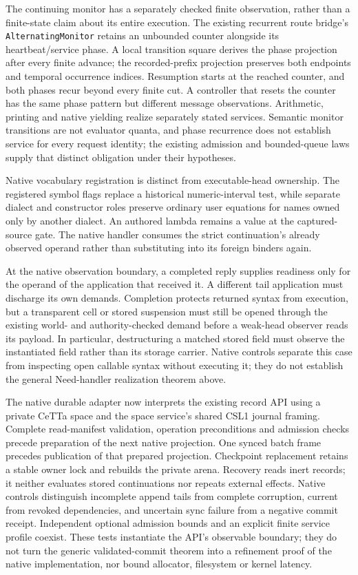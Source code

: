 \documentclass[11pt]{article}
\theoremstyle{definition}
\theoremstyle{remark}
\begin{document}
The continuing monitor has a separately checked finite observation, rather
than a finite-state claim about its entire execution. The existing recurrent
route bridge's \nolinkurl{AlternatingMonitor} retains an unbounded counter
alongside its heartbeat/service phase. A local transition square derives the
phase projection after every finite advance; the recorded-prefix projection
preserves both endpoints and temporal occurrence indices. Resumption starts
at the reached counter, and both phases recur beyond every finite cut. A
controller that resets the counter has the same phase pattern but different
message observations. Arithmetic, printing and native yielding realize
separately stated services. Semantic monitor transitions are not evaluator
quanta, and phase recurrence does not establish service for every request
identity; the existing admission and bounded-queue laws supply that distinct
obligation under their hypotheses.

Native vocabulary registration is distinct from executable-head ownership.
The registered symbol flags replace a historical numeric-interval test, while
separate dialect and constructor roles preserve ordinary user equations for
names owned only by another dialect. An authored lambda remains a value at
the captured-source gate. The native handler consumes the strict continuation's
already observed operand rather than substituting into its foreign binders
again.

At the native observation boundary, a completed reply supplies readiness
only for the operand of the application that received it.  A different tail
application must discharge its own demands.  Completion protects returned
syntax from execution, but a transparent cell or stored suspension must still
be opened through the existing world- and authority-checked demand before a
weak-head observer reads its payload.  In particular, destructuring a matched
stored field must observe the instantiated field rather than its storage
carrier.  Native controls separate this case from inspecting open callable
syntax without executing it; they do not establish the general Need-handler
realization theorem above.

The native durable adapter now interprets the existing record API using a
private CeTTa space and the space service's shared CSL1 journal framing.
Complete read-manifest validation, operation preconditions and admission
checks precede preparation of the next native projection. One synced batch
frame precedes publication of that prepared projection. Checkpoint replacement
retains a stable owner lock and rebuilds the private arena. Recovery reads
inert records; it neither evaluates stored continuations nor repeats external
effects. Native controls distinguish incomplete append tails from complete
corruption, current from revoked dependencies, and uncertain sync failure
from a negative commit receipt. Independent optional admission bounds and an
explicit finite service profile coexist. These tests instantiate the API's
observable boundary; they do not turn the generic validated-commit theorem
into a refinement proof of the native implementation, nor bound allocator,
filesystem or kernel latency.
\end{document}
